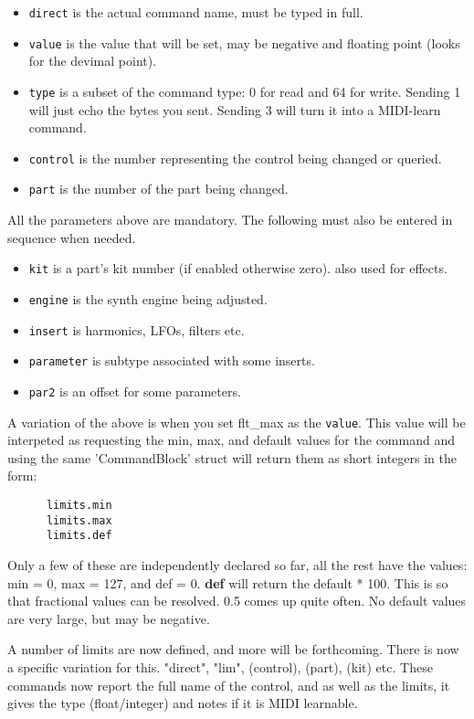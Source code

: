    \begin{itemize}
      \item \texttt{direct} is the actual command name, must be typed in full.
      \item \texttt{value} is the value that will be set, may be negative and
         floating point (looks for the devimal point).
      \item \texttt{type} is a subset of the command type: 0 for read and 64 for
         write. Sending 1 will just echo the bytes you sent.  Sending 3 will
         turn it into a MIDI-learn command.
      \item \texttt{control} is the number representing the control being
         changed or queried.
      \item \texttt{part} is the number of the part being changed.
   \end{itemize}

   All the parameters above are mandatory. The following must also be entered in
   sequence when needed.

   \begin{itemize}
      \item \texttt{kit} is a part's kit number (if enabled otherwise zero).
         also used for effects.
      \item \texttt{engine} is the synth engine being adjusted.
      \item \texttt{insert} is harmonics, LFOs, filters etc.
      \item \texttt{parameter} is subtype associated with some inserts.
      \item \texttt{par2} is an offset for some parameters.
   \end{itemize}

   A variation of the above is when you set flt\_max as the \texttt{value}.
   This value will
   be interpeted as requesting the min, max, and default values for the
   command and using the same 'CommandBlock' struct will return them as short
   integers in the form:

   \begin{verbatim}
      limits.min
      limits.max
      limits.def
   \end{verbatim}

   Only a few of these are independently declared so far, all the rest have the
   values: min = 0, max = 127, and def = 0.  \textbf{def} will return the
   default * 100. This is so that fractional values can be resolved. 0.5 comes
   up quite often. No default values are very large, but may be negative.

   A number of limits are now defined, and more will be forthcoming. There is
   now a specific variation for this. "direct", "lim", (control), (part), (kit)
   etc.  These commands now report the full name of the control, and as well as
   the limits, it gives the type (float/integer) and notes if it is MIDI
   learnable.

